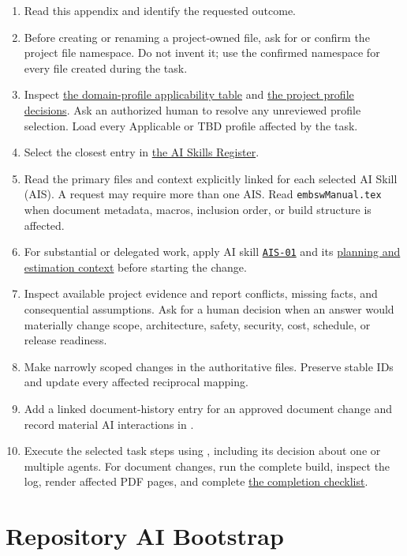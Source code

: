 \begin{enumerate}
\item Read this appendix and identify the requested outcome.
\item Before creating or renaming a project-owned file, ask for or confirm the
project file namespace. Do not invent it; use the confirmed namespace for every
file created during the task.
\item Inspect \hyperref[Table:DomainProfileApplicability]{the domain-profile
applicability table} and \hyperref[Table:ProjectDomainProfiles]{the project
profile decisions}. Ask an authorized human to resolve any unreviewed profile
selection. Load every Applicable or TBD profile affected by the task.
\item Select the closest entry in
\hyperref[Table:AISkills]{the AI Skills Register}.
\item Read the primary files and context explicitly linked for each selected
AI Skill (AIS). A request may require more than one AIS. Read
\texttt{embswManual.tex} when document metadata, macros, inclusion order, or
build structure is affected.
\item For substantial or delegated work, apply AI skill \hyperref[Skill:AIS-01]{\texttt{AIS-01}}
and its \hyperref[Section:AIPlanningEstimateContext]{planning and estimation
context} before starting the change.
\item Inspect available project evidence and report conflicts, missing facts,
and consequential assumptions. Ask for a human decision when an answer would
materially change scope, architecture, safety, security, cost, schedule, or
release readiness.
\item Make narrowly scoped changes in the authoritative files. Preserve stable
IDs and update every affected reciprocal mapping.
\item Add a linked document-history entry for an approved document change and
record material AI interactions in .
\item Execute the selected task steps using
, including its decision about one or
multiple agents. For document changes, run the complete build, inspect the log,
render affected PDF pages, and
complete \hyperref[Table:AICompletionChecklist]{the completion checklist}.
\end{enumerate}

\section{Repository AI Bootstrap}
\label{Section:AIRepositoryBootstrap}

